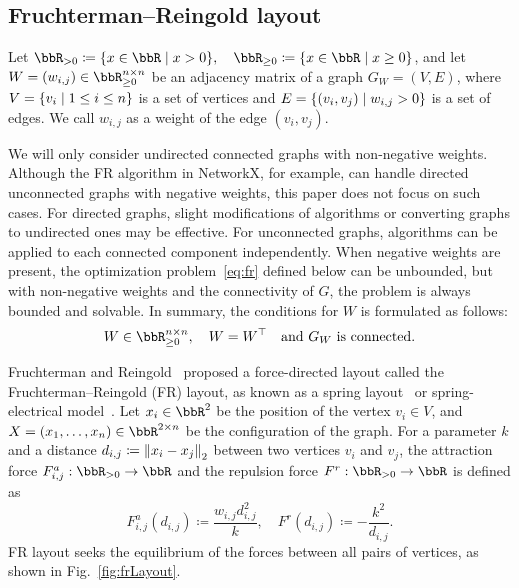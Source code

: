 \documentclass[dvipdfmx,lettersize,journal]{IEEEtran}
\newcommand{\defeq}{\coloneqq}
\begin{document}
\subsection{Fruchterman--Reingold layout}\label{ssec:frLayout}

Let $\bbR_{> 0} \defeq \qty{ x \in \bbR \mid x > 0 }, \quad \bbR_{\geq 0} \defeq \qty{ x \in \bbR \mid x \geq 0 }$, and let $W = (w_{i,j}) \in \bbR_{\geq 0}^{n \times n}$ be an adjacency matrix of a graph $G_W = (V, E)$, where $V = \qty{v_i \mid 1 \leq i \leq n}$ is a set of vertices and $E = \qty{(v_i, v_j) \mid w_{i,j} > 0}$ is a set of edges. We call $w_{i,j}$ as a weight of the edge $(v_i, v_j)$.

We will only consider undirected connected graphs with non-negative weights.
Although the FR algorithm in NetworkX, for example, can handle directed unconnected graphs with negative weights, this paper does not focus on such cases.
For directed graphs, slight modifications of algorithms or converting graphs to undirected ones may be effective.
For unconnected graphs, algorithms can be applied to each connected component independently.
When negative weights are present, the optimization problem~\eqref{eq:fr} defined below can be unbounded, but with non-negative weights and the connectivity of $G$, the problem is always bounded and solvable.
In summary, the conditions for $W$ is formulated as follows:
\begin{equation}\label{eq:WCondition}
  W \in \bbR_{\geq 0}^{n \times n}, \quad W = W^\top \quad \text{and $G_W$ is connected}.
\end{equation}

Fruchterman and Reingold~\cite{fruchtermanGraphDrawingForcedirected1991} proposed a force-directed layout called the Fruchterman--Reingold (FR) layout, as known as a spring layout~\cite{osti_960616} or spring-electrical model~\cite{Hu2006EfficientHF}.
Let $x_i \in \bbR^2$ be the position of the vertex $v_i \in V$, and $X = (x_1, \dots, x_n) \in \bbR^{2 \times n}$ be the configuration of the graph.
For a parameter $k$ and a distance $d_{i,j} \defeq \norm{x_i - x_j}_2$ between two vertices $v_i$ and $v_j$, the attraction force $F_{i,j}^a: \bbR_{> 0} \to \bbR$ and the repulsion force $F^r: \bbR_{> 0} \to \bbR$ is defined as
\begin{equation*}
  F_{i,j}^a(d_{i,j}) \defeq \frac{w_{i,j} d_{i,j}^2}{k}, \quad F^r(d_{i,j}) \defeq -\frac{k^2}{d_{i,j}}.
\end{equation*}
FR layout seeks the equilibrium of the forces between all pairs of vertices, as shown in Fig.~\ref{fig:frLayout}.
\end{document}
